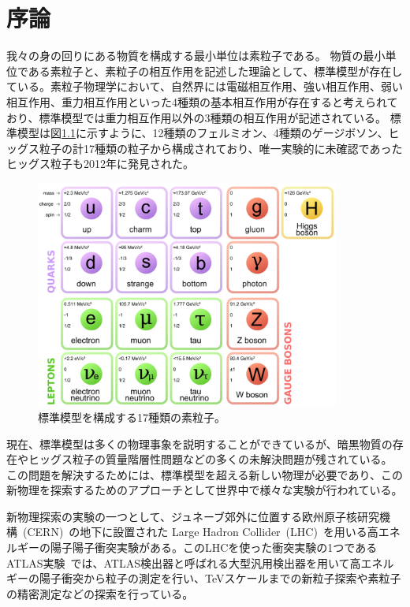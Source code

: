 \chapter{序論}
我々の身の回りにある物質を構成する最小単位は素粒子である。
物質の最小単位である素粒子と、素粒子の相互作用を記述した理論として、標準模型が存在している。素粒子物理学において、自然界には電磁相互作用、強い相互作用、弱い相互作用、重力相互作用といった4種類の基本相互作用が存在すると考えられており、標準模型では重力相互作用以外の3種類の相互作用が記述されている。
標準模型は図\ref{fig:標準模型}に示すように、12種類のフェルミオン、4種類のゲージボソン、ヒッグス粒子の計17種類の粒子から構成されており、唯一実験的に未確認であったヒッグス粒子も2012年に発見された\cite{article:Higgs_boson}。
\begin{figure}[tb]
  \centering
  \includegraphics[clip, width=10cm]{fig/1/standardmodel.jpg}
  \caption{標準模型を構成する17種類の素粒子\cite{article:elementary_particles}。}
  \label{fig:標準模型}
\end{figure}

現在、標準模型は多くの物理事象を説明することができているが、暗黒物質の存在やヒッグス粒子の質量階層性問題などの多くの未解決問題が残されている。
この問題を解決するためには、標準模型を超える新しい物理が必要であり、この新物理を探索するためのアプローチとして世界中で様々な実験が行われている。

新物理探索の実験の一つとして、ジュネーブ郊外に位置する欧州原子核研究機構~(CERN)~\cite{article:CERN}の地下に設置された Large Hadron Collider~(LHC)~\cite{article:LHC}を用いる高エネルギーの陽子陽子衝突実験がある。このLHCを使った衝突実験の1つであるATLAS実験~\cite{Aad:1129811}では、ATLAS検出器と呼ばれる大型汎用検出器を用いて高エネルギーの陽子衝突から粒子の測定を行い、TeVスケールまでの新粒子探索や素粒子の精密測定などの探索を行っている。

